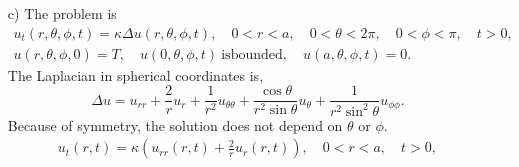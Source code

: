 {\begin{Solution}
\begin{itemize}
\[    R(a) = 0.
    \]
    Recall that the Bessel equation,
    \[
    y'' + \frac{1}{x} y' + \left( \lambda^2 - \frac{\nu^2}{x^2} \right) y = 0,
    \]
    has the general solution $y = c_1 J_\nu(\lambda x) + c_2 Y_\nu(\lambda x)$.
    We discard the Bessel function of the second kind, $Y_\nu$, as it is 
    unbounded at the origin.  The solution for $R(r)$ is
    \[
    R(r) = J_0(\lambda r).
    \]
    Applying the boundary condition at $r = a$, we see that the eigenvalues
    and eigenfunctions are
    \[
    \lambda_n = \frac{\beta_n}{a}, \quad
    R_n = J_0 \left( \frac{\beta_n r}{a} \right), \quad
    n \in \mathbb{N},
    \]
    where $\{ \beta_n \}$ are the positive roots of the Bessel function $J_0$.

    The differential equation for $T$ becomes,
    \[
    T_n' = - \kappa \left( \frac{\beta_n}{a} \right)^2 T_n,
    \]
    which has the solutions,
    \[
    T_n = \exp \left( - \kappa \left( \frac{\beta_n}{a} \right)^2 t \right).
    \]
    The eigen-solutions of the partial differential equation for $u(r,t)$ are,
    \[
    u_n(r,t) = J_0 \left( \frac{\beta_n r}{a} \right)
    \exp \left( - \kappa \left( \frac{\beta_n}{a} \right)^2 t \right).
    \]
    The solution $u(r,t)$ is a linear combination of the eigen-solutions, $u_n$.
    The slowest decaying eigenfunction is,
    \[
    u_1(r,t) = J_0 \left( \frac{\beta_1 r}{a} \right)
    \exp \left( - \kappa \left( \frac{\beta_1}{a} \right)^2 t \right).
    \]
    Thus the e-folding time is
    \[
    \boxed{
      \Delta_e = \frac{a^2}{\kappa \beta_1^2}.
      }
    \]
  \item[c)]
    The problem is
    \begin{gather*}
      u_t(r,\theta,\phi,t) = \kappa \Delta u(r,\theta,\phi,t), \quad
      0 < r < a, \quad 0 < \theta < 2 \pi, \quad 0 < \phi < \pi, \quad t > 0, \\
      u(r,\theta,\phi,0) = T, \quad
      u(0,\theta,\phi,t)\ \mathrm{is bounded}, \quad u(a,\theta,\phi,t) = 0.
    \end{gather*}
    The Laplacian in spherical coordinates is,
    \[
    \Delta u = u_{r r} + \frac{2}{r} u_r + \frac{1}{r^2} u_{\theta\theta}
    + \frac{\cos \theta}{r^2 \sin \theta} u_\theta 
    + \frac{1}{r^2 \sin^2 \theta} u_{\phi\phi}.
    \]
    Because of symmetry, the solution does not depend on $\theta$ or $\phi$.
    \begin{gather*}
      u_t(r,t) = \kappa \left( u_{r r}(r,t) + \frac{2}{r} u_r(r,t) \right), \quad
      0 < r < a, \quad t > 0, \\

\end{gather*}
\end{itemize}
\end{Solution}}
